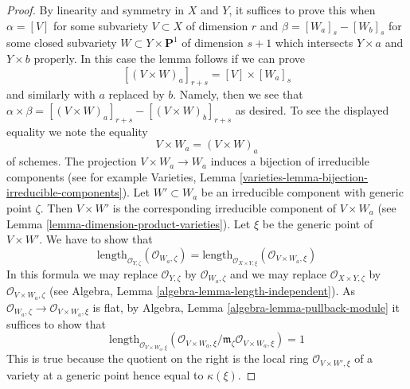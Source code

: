 \documentclass[10pt,a4paper]{amsart}
\theoremstyle{plain}
\theoremstyle{definition}
\theoremstyle{remark}
\numberwithin{equation}{subsection}
\begin{document}
\begin{proof}
By linearity and symmetry in $X$ and $Y$, it suffices to prove this when
$\alpha = [V]$ for some subvariety $V \subset X$ of dimension $r$ and
$\beta = [W_a]_s - [W_b]_s$ for some closed subvariety
$W \subset Y \times \mathbf{P}^1$ of dimension $s + 1$ which
intersects $Y \times a$ and $Y \times b$ properly. In this case
the lemma follows if we can prove
$$
[(V \times W)_a]_{r + s} = [V] \times [W_a]_s
$$
and similarly with $a$ replaced by $b$. Namely, then we see that
$\alpha \times \beta = [(V \times W)_a]_{r + s} - [(V \times W)_b]_{r + s}$
as desired. To see the displayed equality we note the equality
$$
V \times W_a = (V \times W)_a
$$
of schemes. The projection $V \times W_a \to W_a$ induces a bijection
of irreducible components (see for example
Varieties, Lemma \ref{varieties-lemma-bijection-irreducible-components}).
Let $W' \subset W_a$ be an irreducible component with generic point $\zeta$.
Then $V \times W'$ is the corresponding irreducible component of
$V \times W_a$ (see Lemma \ref{lemma-dimension-product-varieties}).
Let $\xi$ be the generic point of $V \times W'$. We have to show that
$$
\text{length}_{\mathcal{O}_{Y, \zeta}}(\mathcal{O}_{W_a, \zeta}) =
\text{length}_{\mathcal{O}_{X \times Y, \xi}}(
\mathcal{O}_{V \times W_a, \xi})
$$
In this formula we may replace
$\mathcal{O}_{Y, \zeta}$ by $\mathcal{O}_{W_a, \zeta}$ and
we may replace
$\mathcal{O}_{X \times Y, \zeta}$ by $\mathcal{O}_{V \times W_a, \zeta}$
(see Algebra, Lemma \ref{algebra-lemma-length-independent}).
As $\mathcal{O}_{W_a, \zeta} \to \mathcal{O}_{V \times W_a, \xi}$ is flat,
by Algebra, Lemma \ref{algebra-lemma-pullback-module} it suffices
to show that
$$
\text{length}_{\mathcal{O}_{V \times W_a, \xi}}(
\mathcal{O}_{V \times W_a, \xi}/
\mathfrak m_\zeta\mathcal{O}_{V \times W_a, \xi}) = 1
$$
This is true because the quotient on the right is the local ring
$\mathcal{O}_{V \times W', \xi}$ of a variety at a generic point
hence equal to $\kappa(\xi)$.
\end{proof}
\end{document}
